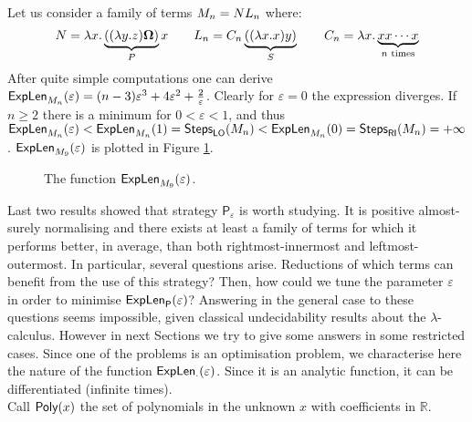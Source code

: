\begin{example}
	Let us consider a family of terms $M_n=NL_n$ where:
	$$
	N = \lambda x.\underbrace{((\lambda y.z)\bm{\Omega})}_P x\qquad
	L_n = C_n\underbrace{((\lambda x.x)y)}_S\qquad
	C_n = \lambda  x.\underbrace{xx\cdots x}_{n\text{ times}}
	$$
	After quite simple computations one can derive $\textsf{ExpLen}_{M_n}(\varepsilon)=(n-3)\varepsilon^3+4\varepsilon^2+\frac{2}{\varepsilon}$. Clearly for $\varepsilon=0$ the expression diverges. If $n\geq 2$ there is a minimum for $0<\varepsilon<1$, and thus $\textsf{ExpLen}_{M_n}(\varepsilon)<\textsf{ExpLen}_{M_n}(1)=\textsf{Steps}_{\textsf{LO}}(M_n)<\textsf{ExpLen}_{M_n}(0)=\textsf{Steps}_{\textsf{RI}}(M_n)=+\infty$. $\textsf{ExpLen}_{M_9}(\varepsilon)$ is plotted in Figure \ref{figure:plot}.
	\begin{figure}
		\caption{The function $\textsf{ExpLen}_{M_9}(\varepsilon)$.}
		\label{figure:plot}
	\end{figure}
\end{example}
Last two results showed that strategy $\mathsf{P}_\varepsilon$ is worth studying. It is positive almost-surely normalising and there exists at least a family of terms for which it performs better, in average, than both rightmost-innermost and leftmost-outermost. In particular, several questions arise. Reductions of which terms can benefit from the use of this strategy? Then, how could we tune the parameter $\varepsilon$ in order to minimise $\textsf{ExpLen}_{\mathsf{P}}(\varepsilon)$? Answering in the general case to these questions seems impossible, given classical undecidability results about the $\lambda$-calculus. However in next Sections we try to give some answers in some restricted cases. Since one of the problems is an optimisation problem, we characterise here the nature of the function $\textsf{ExpLen}_{\cdot}(\varepsilon)$. Since it is an analytic function, it can be differentiated (infinite times).\\
Call $\textsf{Poly}(x)$ the set of polynomials in the unknown $x$ with coefficients in $\mathbb{R}$.
